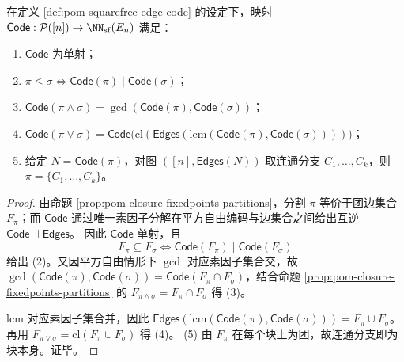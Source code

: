 \begin{theorem}\label{thm:pom-partition-prime-closure-model}
在定义 \ref{def:pom-squarefree-edge-code} 的设定下，映射 \(\mathsf{Code}:\mathcal{P}([n])\to \NN_{\mathrm{sf}}(E_n)\) 满足：
\begin{enumerate}
  \item \(\mathsf{Code}\) 为单射；
  \item \(\pi\le\sigma\iff \mathsf{Code}(\pi)\mid \mathsf{Code}(\sigma)\)；
  \item \(\mathsf{Code}(\pi\wedge\sigma)=\gcd(\mathsf{Code}(\pi),\mathsf{Code}(\sigma))\)；
  \item \(\mathsf{Code}(\pi\vee\sigma)=\mathsf{Code}\!\bigl(\mathrm{cl}(\mathsf{Edges}(\mathrm{lcm}(\mathsf{Code}(\pi),\mathsf{Code}(\sigma))))\bigr)\)；
  \item 给定 \(N=\mathsf{Code}(\pi)\)，对图 \(([n],\mathsf{Edges}(N))\) 取连通分支 \(C_1,\dots,C_k\)，则 \(\pi=\{C_1,\dots,C_k\}\)。
\end{enumerate}
\end{theorem}
\begin{proof}
由命题 \ref{prop:pom-closure-fixedpoints-partitions}，分割 \(\pi\) 等价于团边集合 \(F_\pi\)；而 \(\mathsf{Code}\) 通过唯一素因子分解在平方自由编码与边集合之间给出互逆 \(\mathsf{Code}\dashv\mathsf{Edges}\)。
因此 \(\mathsf{Code}\) 单射，且
\[
F_\pi\subseteq F_\sigma\iff \mathsf{Code}(F_\pi)\mid \mathsf{Code}(F_\sigma)
\]
给出 (2)。又因平方自由情形下 \(\gcd\) 对应素因子集合交，故
\(
\gcd(\mathsf{Code}(\pi),\mathsf{Code}(\sigma))=\mathsf{Code}(F_\pi\cap F_\sigma)
\)，结合命题 \ref{prop:pom-closure-fixedpoints-partitions} 的 \(F_{\pi\wedge\sigma}=F_\pi\cap F_\sigma\) 得 (3)。
\par
\(\mathrm{lcm}\) 对应素因子集合并，因此
\(
\mathsf{Edges}(\mathrm{lcm}(\mathsf{Code}(\pi),\mathsf{Code}(\sigma)))=F_\pi\cup F_\sigma
\)。
再用 \(F_{\pi\vee\sigma}=\mathrm{cl}(F_\pi\cup F_\sigma)\) 得 (4)。
(5) 由 \(F_\pi\) 在每个块上为团，故连通分支即为块本身。证毕。
\end{proof}

